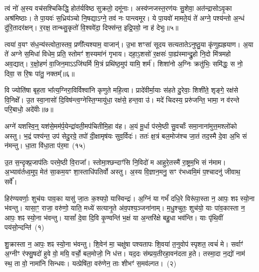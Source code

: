  त्वं नो॑ अ॒स्य वच॑सश्चिकिद्धि॒ होत॑र्यविष्ठ सुक्रतो॒ दमू॑नाः। अस्व॑प्नजस्त॒रण॑यः सु॒शेवा॒ अत॑न्द्रासोऽवृ॒का अश्र॑मिष्ठाः। ते पा॒यवः॑ स॒ध्रिय॑ञ्चो नि॒षद्याऽग्ने॒ तव॑ नः पान्त्वमूर। ये पा॒यवो॑ मामते॒यं ते॑ अग्ने॒ पश्य॑न्तो अ॒न्धं दु॑रि॒तादर॑क्षन्। र॒रक्ष॒ तान्थ्सु॒कृतो॑ वि॒श्ववे॑दा॒ दिफ्स॑न्त॒ इद्रि॒पवो॒ ना ह॑ देभुः॥५॥
 
त्वया॑ व॒यꣳ स॑ध॒न्य॑स्त्वोता॒स्तव॒ प्रणी᳚त्यश्याम॒ वाजान्॑। उ॒भा शꣳसा॑ सूदय सत्यतातेऽनुष्ठु॒या कृ॑णुह्यह्रयाण। अ॒या ते॑ अग्ने स॒मिधा॑ विधेम॒ प्रति॒ स्तोमꣳ॑ श॒स्यमा॑नं गृभाय। दहा॒ऽ॒शसो॑ र॒क्षसः॑ पा॒ह्य॑स्मान्द्रु॒हो नि॒दो मि॑त्रमहो अव॒द्यात्। र॒क्षो॒हणं॑ वा॒जिन॒माऽऽजि॑घर्मि मि॒त्रं प्रथि॑ष्ठ॒मुप॑ यामि॒ शर्म॑। शिशा॑नो अ॒ग्निः क्रतु॑भिः॒ समि॑द्धः॒ स नो॒ दिवा॒ स रि॒षः पा॑तु॒ नक्तम्᳚॥६॥

 वि ज्योति॑षा बृह॒ता भा᳚त्य॒ग्निरा॒विर्विश्वा॑नि कृणुते महि॒त्वा। प्रादे॑वीर्मा॒याः स॑हते दु॒रेवाः॒ शिशी॑ते॒ शृङ्गे॒ रक्ष॑से वि॒निक्षे᳚। उ॒त स्वा॒नासो॑ दि॒विष॑न्त्व॒ग्नेस्ति॒ग्मायु॑धा॒ रक्ष॑से॒ हन्त॒वा उ॑। मदे॑ चिदस्य॒ प्ररु॑जन्ति॒ भामा॒ न व॑रन्ते परि॒बाधो॒ अदे॑वीः॥७॥



अग्ने॑ यशस्वि॒न्॒ यश॑से॒मम॑र्प॒येन्द्रा॑वती॒मप॑चितीमि॒हा व॑ह। अ॒यं मू॒र्धा प॑रमे॒ष्ठी सु॒वर्चाः᳚ समा॒नाना॑मुत्त॒मश्लो॑को अस्तु। भ॒द्रं पश्य॑न्त॒ उप॑ सेदु॒रग्रे॒ तपो॑ दी॒क्षामृष॑यः सुव॒र्विदः॑। ततः॑ क्ष॒त्रं बल॒मोज॑श्च जा॒तं तद॒स्मै दे॒वा अ॒भि सं न॑मन्तु। धा॒ता वि॑धा॒ता प॑र॒मा~(१५)

उ॒त स॒न्दृक्प्र॒जा\-प॑तिः परमे॒ष्ठी वि॒राजा᳚। स्तोमा॒श्छन्दाꣳ॑सि नि॒विदो॑ म आहुरे॒तस्मै॑ रा॒ष्ट्रम॒भि सं न॑माम। अ॒भ्याव॑र्तध्व॒मुप॒ मेत॑ सा॒कम॒यꣳ शा॒स्ताधि॑पतिर्वो अस्तु। अ॒स्य वि॒ज्ञान॒मनु॒ सꣳ र॑भध्वमि॒मं प॒श्चादनु॑ जीवाथ॒ सर्वे᳚। 



हिर॑ण्यवर्णाः॒ शुच॑यः पाव॒का यासु॑ जा॒तः क॒श्यपो॒ यास्विन्द्रः॑। अ॒ग्निं या गर्भं॑ दधि॒रे विरू॑पा॒स्ता न॒ आपः॒ शꣴ स्यो॒ना भ॑वन्तु। यासा॒ꣳ॒ राजा॒ वरु॑णो॒ याति॒ मध्ये॑ सत्यानृ॒ते अ॑व॒पश्य॒ञ्जना॑नाम्। म॒धु॒श्चुतः॒ शुच॑यो॒ याः पा॑व॒कास्ता न॒ आपः॒ शꣴ स्यो॒ना भ॑वन्तु। यासां᳚ दे॒वा दि॒वि कृ॒ण्वन्ति॑ भ॒क्षं या अ॒न्तरि॑क्षे बहु॒धा भव॑न्ति। याः पृ॑थि॒वीं पय॑सो॒न्दन्ति॑~(१)

शु॒क्रास्ता न॒ आपः॒ शꣴ स्यो॒ना भ॑वन्तु। शि॒वेन॑ मा॒ चक्षु॑षा पश्यतापः शि॒वया॑ त॒नुवोप॑ स्पृशत॒ त्वचं॑ मे। सर्वाꣳ॑ अ॒ग्नीꣳ र॑फ्सु॒षदो॑ हुवे वो॒ मयि॒ वर्चो॒ बल॒मोजो॒ नि ध॑त्त। यद॒दः स॑म्प्रय॒तीरहा॒वन॑दता ह॒ते। तस्मा॒दा न॒द्यो॑ नाम॑ स्थ॒ ता वो॒ नामा॑नि सिन्धवः। यत्प्रेषि॑ता॒ वरु॑णेन॒ ताः शीभꣳ॑ स॒मव॑ल्गत।~(२)

